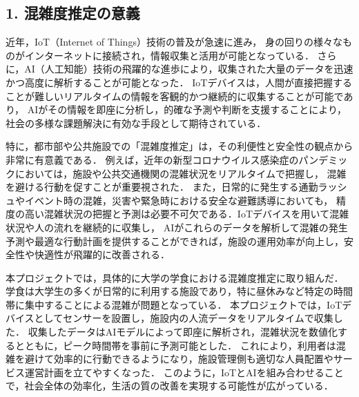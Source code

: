 \subsection*{1. 混雑度推定の意義}
近年，IoT（Internet of Things）技術の普及が急速に進み，
身の回りの様々なものがインターネットに接続され，情報収集と活用が可能となっている．
さらに，AI（人工知能）技術の飛躍的な進歩により，収集された大量のデータを迅速かつ高度に解析することが可能となった．
IoTデバイスは，人間が直接把握することが難しいリアルタイムの情報を客観的かつ継続的に収集することが可能であり，
AIがその情報を即座に分析し，的確な予測や判断を支援することにより，社会の多様な課題解決に有効な手段として期待されている．

特に，都市部や公共施設での「混雑度推定」は，その利便性と安全性の観点から非常に有意義である．
例えば，近年の新型コロナウイルス感染症のパンデミックにおいては，施設や公共交通機関の混雑状況をリアルタイムで把握し，
混雑を避ける行動を促すことが重要視された．
また，日常的に発生する通勤ラッシュやイベント時の混雑，災害や緊急時における安全な避難誘導においても，
精度の高い混雑状況の把握と予測は必要不可欠である．IoTデバイスを用いて混雑状況や人の流れを継続的に収集し，
AIがこれらのデータを解析して混雑の発生予測や最適な行動計画を提供することができれば，施設の運用効率が向上し，安全性や快適性が飛躍的に改善される．

本プロジェクトでは，具体的に大学の学食における混雑度推定に取り組んだ．
学食は大学生の多くが日常的に利用する施設であり，特に昼休みなど特定の時間帯に集中することによる混雑が問題となっている．
本プロジェクトでは，IoTデバイスとしてセンサーを設置し，施設内の人流データをリアルタイムで収集した．
収集したデータはAIモデルによって即座に解析され，混雑状況を数値化するとともに，ピーク時間帯を事前に予測可能とした．
これにより，利用者は混雑を避けて効率的に行動できるようになり，施設管理側も適切な人員配置やサービス運営計画を立てやすくなった．
このように，IoTとAIを組み合わせることで，社会全体の効率化，生活の質の改善を実現する可能性が広がっている．
%
